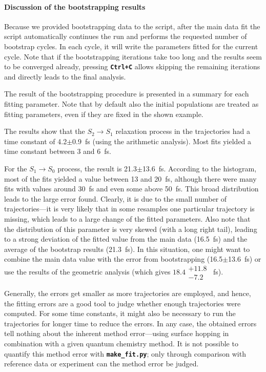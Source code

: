 \documentclass[a4paper,11pt,DIV=15,openany]{scrbook}
\newcommand{\ttt}[1]{\textbf{\texttt{#1}}}
\begin{document}
\paragraph{Discussion of the bootstrapping results}

Because we provided bootstrapping data to the script, after the main data fit the script automatically continues the run and performs the requested number of bootstrap cycles.
In each cycle, it will write the parameters fitted for the current cycle.
Note that if the bootstrapping iterations take too long and the results seem to be converged already, pressing \ttt{Ctrl+C} allows skipping the remaining iterations and directly leads to the final analysis.

The result of the bootstrapping procedure is presented in a summary for each fitting parameter.
Note that by default also the initial populations are treated as fitting parameters, even if they are fixed in the shown example.

The results show that the $S_2\rightarrow S_1$ relaxation process in the trajectories had a time constant of 4.2$\pm$0.9~fs (using the arithmetic analysis).
Most fits yielded a time constant between 3 and 6~fs.

For the $S_1\rightarrow S_0$ process, the result is 21.3$\pm$13.6~fs.
According to the histogram, most of the fits yielded a value between 13 and 20~fs, although there were many fits with values around 30~fs and even some above 50~fs.
This broad distribution leads to the large error found.
Clearly, it is due to the small number of trajectories---it is very likely that in some resamples one particular trajectory is missing, which leads to a large change of the fitted parameters.
Also note that the distribution of this parameter is very skewed (with a long right tail), leading to a strong deviation of the fitted value from the main data (16.5~fs) and the average of the bootstrap results (21.3~fs).
In this situation, one might want to combine the main data value with the error from bootstrapping (16.5$\pm$13.6~fs) or use the results of the geometric analysis (which gives $18.4\substack{+11.8\\-7.2}$~fs).

Generally, the errors get smaller as more trajectories are employed, and hence, the fitting errors are a good tool to judge whether enough trajectories were computed.
For some time constants, it might also be necessary to run the trajectories for longer time to reduce the errors.
In any case, the obtained errors tell nothing about the inherent method error---using surface hopping in combination with a given quantum chemistry method.
It is not possible to quantify this method error with \ttt{make\_fit.py}; only through comparison with reference data or experiment can the method error be judged.
\end{document}
